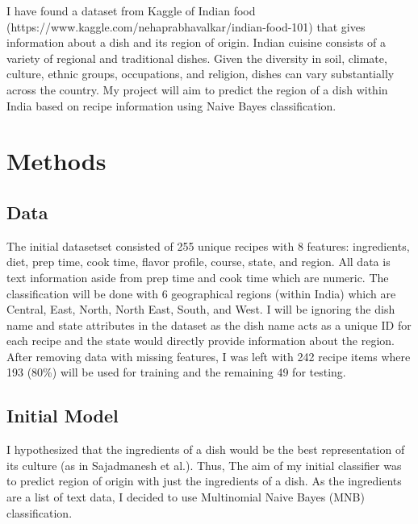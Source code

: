 \documentclass[12pt]{article}
\begin{document}
\noindent I have found a dataset from Kaggle of Indian food (https://www.kaggle.com/nehaprabhavalkar/indian-food-101) that gives information about a dish and its region of origin. Indian cuisine consists of a variety of regional and traditional dishes. Given the diversity in soil, climate, culture, ethnic groups, occupations, and religion, dishes can vary substantially across the country. My project will aim to predict the region of a dish within India based on recipe information using Naive Bayes classification. 

\section{Methods}
\subsection{Data}
The initial datasetset consisted of 255 unique recipes with 8 features: ingredients, diet, prep time, cook time, flavor profile, course, state, and region. 
All data is text information aside from prep time and cook time which are numeric.
The classification will be done with 6 geographical regions (within India) which are Central, East, North, North East, South, and West. 
I will be ignoring the dish name and state attributes in the dataset as the dish name acts as a unique ID for each recipe and the state would directly provide information about 
the region.
After removing data with missing features, I was left with 242 recipe items where 193 (80\%)
will be used for training and the remaining 49 for testing.

\subsection{Initial Model}

\noindent I hypothesized that the ingredients of a dish would be the best representation of its culture (as in Sajadmanesh et al.\cite{Sajadmanesh}). Thus, The aim of my initial classifier was to predict region of origin with just the ingredients of a dish.
As the ingredients are a list of text data, I decided to use Multinomial Naive Bayes (MNB) classification. \\
\end{document}

